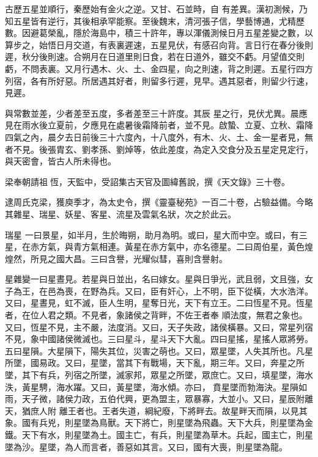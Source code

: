 \begin{pinyinscope}
 古歷五星並順行，秦歷始有金火之逆。又甘、石並時，自
 有差異。漢初測候，乃知五星皆有逆行，其後相承罕能察。至後魏末，清河張子信，學藝博通，尤精歷數。因避葛榮亂，隱於海島中，積三十許年，專以渾儀測候日月五星差變之數，以算步之，始悟日月交道，有表裏遲速，五星見伏，有感召向背。言日行在春分後則遲，秋分後則速。合朔月在日道里則日食，若在日道外，雖交不虧。月望值交則虧，不問表裏。又月行遇木、火、土、金四星，向之則速，背之則遲。五星行四方列宿，各有所好惡。所居遇其好者，則留多行遲，見早。遇其惡者，則留少行速，見遲。



 與常數並差，少者差至五度，多者差至三十許度。其辰
 星之行，見伏尤異。晨應見在雨水後立夏前，夕應見在處暑後霜降前者，並不見。啟蟄、立夏、立秋、霜降四氣之內，晨夕去日前後三十六度內，十八度外，有木、火、土、金一星者見，無者不見。後張胄玄、劉孝孫、劉焯等，依此差度，為定入交食分及五星定見定行，與天密會，皆古人所未得也。



 梁奉朝請祖恆，天監中，受詔集古天官及圖緯舊說，撰《天文錄》三十卷。



 逮周氏克梁，獲庾季才，為太史令，撰《靈臺秘苑》一百二十卷，占驗益備。今略其雜星、瑞星、妖星、客星、流星及雲氣名狀，次之於此云。



 瑞星
 一曰景星，如半月，生於晦朔，助月為明。或曰，星大而中空。或曰，有三星，在赤方氣，與青方氣相連。黃星在赤方氣中，亦名德星。二曰周伯星，黃色煌煌然，所見之國大昌。三曰含譽，光耀似彗，喜則含譽射。



 星雜變一曰星晝見。若星與日並出，名曰嫁女。星與日爭光，武且弱，文且強，女子為王，在邑為喪，在野為兵。又曰，臣有奸心，上不明，臣下從橫，大水浩洋。又曰，星晝見，虹不滅，臣人生明，星奪日光，天下有立王。二曰恆星不見。恆星者，在位人君之類。不見者，象諸侯之背畔，不佐王者奉
 順法度，無君之象也。又曰，恆星不見，主不嚴，法度消。又曰，天子失政，諸侯橫暴。又曰，常星列宿不見，象中國諸侯微滅也。三曰星斗，星斗天下大亂。四曰星搖，星搖人眾將勞。五曰星隕。大星隕下，陽失其位，災害之萌也。又曰，眾星墜，人失其所也。凡星所墜，國易政。又曰，星墜，當其下有戰場，天下亂，期三年。又曰，奔星之所墜，其下有兵，列宿之所墜，滅家邦，眾星之所墜，眾庶亡。又曰，填星墜，海水泆，黃星騁，海水躍。又曰，黃星墜，海水傾。亦曰，賁星墜而勃海決。星隕如雨，天子微，諸侯力政，五伯代興，更為盟主，眾暴寡，大並小。又曰，星辰附離天，猶庶人附
 離王者也。王者失道，綱紀廢，下將畔去。故星畔天而隕，以見其象。國有兵兇，則星墜為鳥獸。天下將亡，則星墜為飛蟲。天下大兵，則星墜為金鐵。天下有水，則星墜為土。國主亡，有兵，則星墜為草木。兵起，國主亡，則星墜為沙。星墜，為人而言者，善惡如其言。又曰，國有大喪，則星墜為龍。




\end{pinyinscope}

